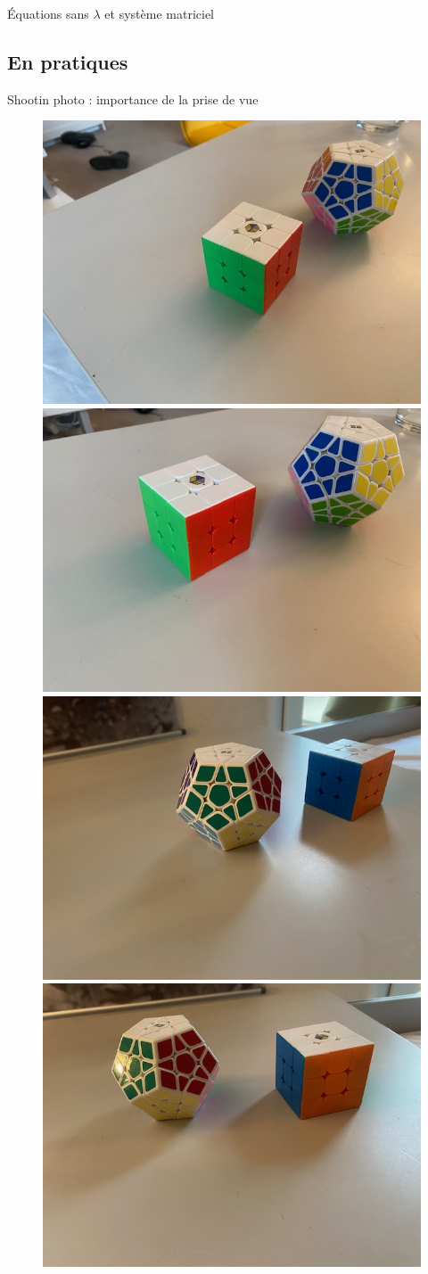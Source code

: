 \begin{frame}{Équations sans \(\lambda\) et système matriciel}
  
\end{frame}

\subsection{En pratiques}

\begin{frame}{Shootin photo : importance de la prise de vue}
  \centering
  \begin{minipage}{0.48\linewidth}
    \centering
    \begin{figure}
      \centering
      \includegraphics[width=0.48\linewidth]{capture/dodec0.jpg}%
      \includegraphics[width=0.48\linewidth]{capture/dodec1.jpg} \\
      \includegraphics[width=0.48\linewidth]{capture/dodec2.jpg}%
      \includegraphics[width=0.48\linewidth]{capture/dodec3.jpg}

\end{figure}
\end{minipage}
\end{frame}
